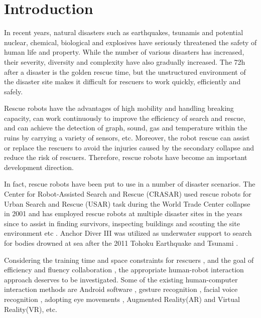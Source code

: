 \chapter{Introduction}
In recent years, natural disasters such as earthquakes, tsunamis and potential nuclear, chemical, biological and explosives have seriously threatened the safety of human life and property. While the number of various disasters has increased, their severity, diversity and complexity have also gradually increased. The 72h after a disaster is the golden rescue time, but the unstructured environment of the disaster site makes it difficult for rescuers to work quickly, efficiently and safely.

Rescue robots have the advantages of high mobility and handling breaking capacity, can work continuously to improve the efficiency of search and rescue, and can achieve the detection of graph, sound, gas and temperature within the ruins by carrying a variety of sensors, etc.
Moreover, the robot rescue can assist or replace the rescuers to avoid the injuries caused by the secondary collapse and reduce the risk of rescuers. Therefore, rescue robots have become an important development direction.

In fact, rescue robots have been put to use in a number of disaster scenarios. The Center for Robot-Assisted Search and Rescue (CRASAR) used rescue robots for Urban Search and Rescue (USAR) task during the World Trade Center collapse in 2001 \cite{Casper:2003tk} and has employed rescue robots at multiple disaster sites in the years since to assist in finding survivors, inspecting buildings and scouting the site environment etc \cite{Murphy:2012th}. Anchor Diver III was utilized as underwater support to search for bodies drowned at sea after the 2011 Tohoku Earthquake and Tsunami \cite{Huang:2011wq}.

Considering the training time and space constraints for rescuers \cite{Murphy:2004wl}, and the goal of eﬃciency and ﬂuency collaboration \cite{10.1145/1228716.1228718}, the appropriate human-robot interaction approach deserves to be investigated. Some of the existing human-computer interaction methods are Android software \cite{Sarkar:2017tt} \cite{Faisal:2019uu}, gesture recognition\cite{Sousa:2017tn} \cite{10.1145/2157689.2157818} \cite{Nagi:2014vu}, facial voice recognition \cite{Pourmehr:2013ta}, adopting eye movements \cite{Ma:2015wu}, Augmented Reality(AR)\cite{SOARES20151656} and Virtual Reality(VR), etc.